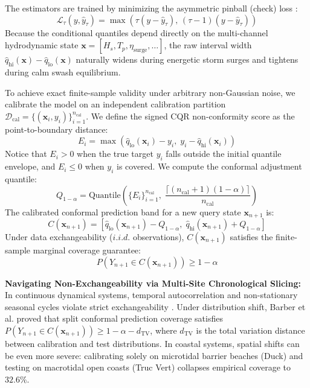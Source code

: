 \documentclass[journal]{IEEEtran}
\begin{document}
The estimators are trained by minimizing the asymmetric pinball (check) loss \cite{koenker1978regression}:
\begin{equation}
\mathcal{L}_\tau(y, \hat{y}_\tau) = \max\left(\tau(y - \hat{y}_\tau),\, (\tau - 1)(y - \hat{y}_\tau)\right)
\label{eq:pinball_loss}
\end{equation}
Because the conditional quantiles depend directly on the multi-channel hydrodynamic state $\mathbf{x} = [H_s, T_p, \eta_{\text{surge}}, \dots]$, the raw interval width $\hat{q}_{\text{hi}}(\mathbf{x}) - \hat{q}_{\text{lo}}(\mathbf{x})$ naturally widens during energetic storm surges and tightens during calm swash equilibrium.

To achieve exact finite-sample validity under arbitrary non-Gaussian noise, we calibrate the model on an independent calibration partition $\mathcal{D}_{\text{cal}} = \{(\mathbf{x}_i, y_i)\}_{i=1}^{n_{\text{cal}}}$. We define the signed CQR non-conformity score as the point-to-boundary distance:
\begin{equation}
E_i = \max\left(\hat{q}_{\text{lo}}(\mathbf{x}_i) - y_i,\; y_i - \hat{q}_{\text{hi}}(\mathbf{x}_i)\right)
\label{eq:nonconformity_score}
\end{equation}
Notice that $E_i > 0$ when the true target $y_i$ falls outside the initial quantile envelope, and $E_i \le 0$ when $y_i$ is covered. We compute the conformal adjustment quantile:
\begin{equation}
Q_{1-\alpha} = \text{Quantile}\left(\{E_i\}_{i=1}^{n_{\text{cal}}},\; \frac{\lceil (n_{\text{cal}} + 1)(1 - \alpha) \rceil}{n_{\text{cal}}}\right)
\label{eq:conformal_quantile}
\end{equation}
The calibrated conformal prediction band for a new query state $\mathbf{x}_{n+1}$ is:
\begin{equation}
C(\mathbf{x}_{n+1}) = \left[ \hat{q}_{\text{lo}}(\mathbf{x}_{n+1}) - Q_{1-\alpha},\; \hat{q}_{\text{hi}}(\mathbf{x}_{n+1}) + Q_{1-\alpha} \right]
\label{eq:conformal_interval}
\end{equation}
Under data exchangeability ($i.i.d.$ observations), $C(\mathbf{x}_{n+1})$ satisfies the finite-sample marginal coverage guarantee:
\begin{equation}
P\left(Y_{n+1} \in C(\mathbf{x}_{n+1})\right) \ge 1 - \alpha
\label{eq:coverage_guarantee}
\end{equation}

\noindent\textbf{Navigating Non-Exchangeability via Multi-Site Chronological Slicing:} In continuous dynamical systems, temporal autocorrelation and non-stationary seasonal cycles violate strict exchangeability \cite{barber2023conformal}. Under distribution shift, Barber et al. \cite{barber2023conformal} proved that split conformal prediction coverage satisfies $P(Y_{n+1} \in C(\mathbf{x}_{n+1})) \ge 1 - \alpha - d_{\text{TV}}$, where $d_{\text{TV}}$ is the total variation distance between calibration and test distributions. In coastal systems, spatial shifts can be even more severe: calibrating solely on microtidal barrier beaches (Duck) and testing on macrotidal open coasts (Truc Vert) collapses empirical coverage to $32.6\%$. 
\end{document}
